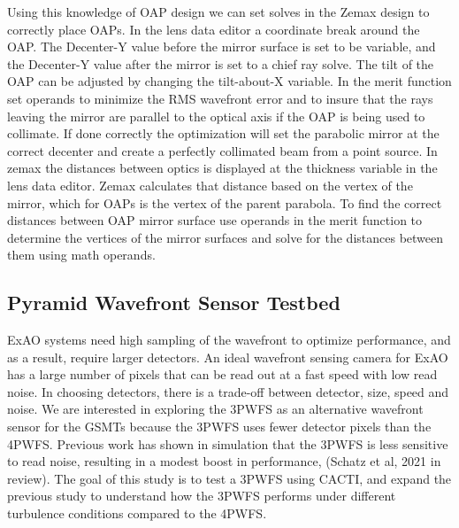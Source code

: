Using this knowledge of OAP design we can set solves in the Zemax design to correctly place OAPs. In the lens data editor a coordinate break around the OAP. The Decenter-Y value before the mirror surface is set to be variable, and the Decenter-Y value after the mirror is set to a chief ray solve. The tilt of the OAP can be adjusted by changing the tilt-about-X variable.  In the merit function set operands to minimize the RMS wavefront error and to insure that the rays leaving the mirror are parallel to the optical axis if the OAP is being used to collimate. If done correctly the optimization will set the parabolic mirror at the correct decenter and create a perfectly collimated beam from a point source. In zemax the distances between optics is displayed at the thickness variable in the lens data editor. Zemax calculates that distance based on the vertex of the mirror, which for OAPs is the vertex of the parent parabola. To find the correct distances between OAP mirror surface use operands in the merit function to determine the vertices of the mirror surfaces and solve for the distances between them using math operands. 



\subsection{Pyramid Wavefront Sensor Testbed}

ExAO systems need high sampling of the wavefront to optimize performance, and as a result, require larger detectors. An ideal wavefront sensing camera for ExAO has a large number of pixels that can be read out at a fast speed with low read noise. In choosing detectors, there is a trade-off between detector, size, speed and noise. We are interested in exploring the 3PWFS as an alternative wavefront sensor for the GSMTs because the 3PWFS uses fewer detector pixels than the 4PWFS. Previous work has shown in simulation that the 3PWFS is less sensitive to read noise, resulting in a modest boost in performance, (Schatz et al, 2021 in review). The goal of this study is to test a 3PWFS using CACTI, and expand the previous study to understand how the 3PWFS performs under different turbulence conditions compared to the 4PWFS. 

